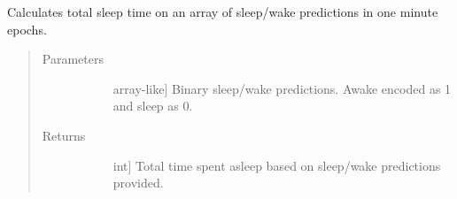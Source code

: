 \documentclass[letterpaper,10pt,english]{sphinxmanual}
\begin{document}
\begin{fulllineitems}
\label{\detokenize{index:sleeppy.utils.total_sleep_time}}
Calculates total sleep time on an array of sleep/wake predictions in one minute epochs.
\begin{quote}\begin{description}
\item[{Parameters}] \leavevmode\begin{description}
\item[{}] \leavevmode{[}array-like{]}
Binary sleep/wake predictions. Awake encoded as 1 and sleep as 0.

\end{description}

\item[{Returns}] \leavevmode\begin{description}
\item[{}] \leavevmode{[}int{]}
Total time spent asleep based on sleep/wake predictions provided.

\end{description}

\end{description}\end{quote}

\end{fulllineitems}

\end{document}
